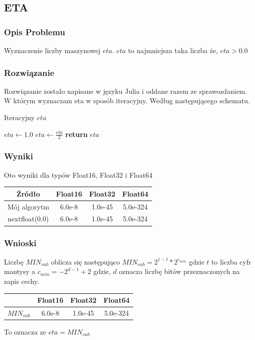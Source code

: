 \documentclass{article}
\begin{document}
\subsection{ETA}
\subsubsection{Opis Problemu}
    Wyznaczenie liczby maszynowej $eta$. $eta$ to najmniejsza taka liczba że, $eta > 0.0$
\subsubsection{Rozwiązanie}
    Rozwiązanie zostało napisane w języku Julia i oddane razem ze sprawozdaniem. W którym wyznaczam eta w sposób iteracyjny. Według następującego schematu.
    \begin{algorithm}
    \caption{Iteracyjny $eta$}\label{alg:cap}
    \begin{algorithmic}
        \State $eta \gets 1.0$
            \State $eta \gets \frac{eta}{2}$
        \EndWhile
        \State \textbf{return} $eta$
    \end{algorithmic}
    \end{algorithm}
\subsubsection{Wyniki}
    Oto wyniki dla typów Float16, Float32 i Float64
    \begin{center}
        \begin{tabular}{|c||c|c|c|}
        \hline
            Źródło & Float16 & Float32 & Float64 \\
            \hline\hline
            Mój algorytm & 6.0e-8 & 1.0e-45 & 5.0e-324\\
             \hline
             nextfloat(0.0) & 6.0e-8 & 1.0e-45 & 5.0e-324\\
        \hline
        \end{tabular}
    \end{center}
\subsubsection{Wnioski}
    Liczbę $MIN_{sub}$ oblicza się następująco $MIN_{sub} = 2^{1-t}*2^{c_{min}}$ gdzie $t$ to liczba cyfr mantysy a $c_{min}=-2^{d-1}+2$ gdzie, $d$ oznacza liczbę bitów przeznaczonych na zapis cechy.
        \begin{center}
        \begin{tabular}{|c|c|c|c|}
        \hline
             & Float16 & Float32 & Float64 \\
            \hline
            $MIN_{sub}$ & 6.0e-8 & 1.0e-45 & 5.0e-324\\
        \hline
        \end{tabular}
    \end{center}
    To oznacza ze $eta = MIN_{sub}$
\end{document}
